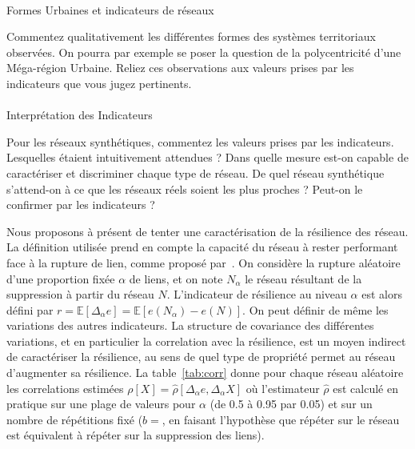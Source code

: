 \bigskip


\paragraph{}{Formes Urbaines et indicateurs de réseaux}

Commentez qualitativement les différentes formes des systèmes territoriaux observées. On pourra par exemple se poser la question de la polycentricité d'une Méga-région Urbaine. Reliez ces observations aux valeurs prises par les indicateurs que vous jugez pertinents.


\medskip


\paragraph{}{Interprétation des Indicateurs}

Pour les réseaux synthétiques, commentez les valeurs prises par les indicateurs. Lesquelles étaient intuitivement attendues ? Dans quelle mesure est-on capable de caractériser et discriminer chaque type de réseau. De quel réseau synthétique s'attend-on à ce que les réseaux réels soient les plus proches ? Peut-on le confirmer par les indicateurs ?


\bigskip


Nous proposons à présent de tenter une caractérisation de la résilience des réseau. La définition utilisée prend en compte la capacité du réseau à rester performant face à la rupture de lien, comme proposé par~\cite{ash2007optimizing}. On considère la rupture aléatoire d'une proportion fixée $\alpha$ de liens, et on note $N_{\alpha}$ le réseau résultant de la suppression à partir du réseau $N$. L'indicateur de résilience au niveau $\alpha$ est alors défini par $r = \mathbb{E} \left[\Delta_{\alpha} e \right] = \mathbb{E}\left[ e\left(N_{\alpha}\right) - e\left(N\right)\right]$. On peut définir de même les variations des autres indicateurs. La structure de covariance des différentes variations, et en particulier la correlation avec la résilience, est un moyen indirect de caractériser la résilience, au sens de quel type de propriété permet au réseau d'augmenter sa résilience. La table~\ref{tab:corr} donne pour chaque réseau aléatoire les correlations estimées $\rho\left[X\right] = \hat{\rho}\left[\Delta_{\alpha} e,\Delta_{\alpha} X\right]$ où l'estimateur $\hat{\rho}$ est calculé en pratique sur une plage de valeurs pour $\alpha$ (de 0.5 à 0.95 par 0.05) et sur un nombre de répétitions fixé ($b=$, en faisant l'hypothèse que répéter sur le réseau est équivalent à répéter sur la suppression des liens).


